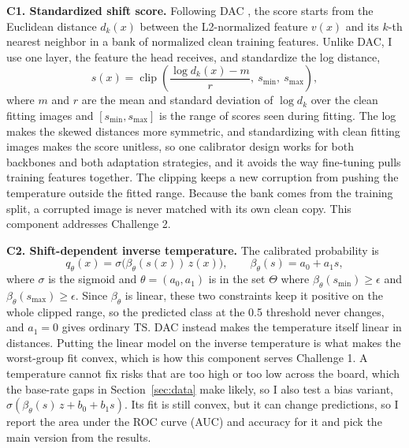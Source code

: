 \documentclass[sigconf,nonacm]{acmart}
\begin{document}
\textbf{C1. Standardized shift score.} Following DAC \cite{tomani2023dac}, the score starts from the Euclidean distance $d_k(x)$ between the L2-normalized feature $v(x)$ and its $k$-th nearest neighbor in a bank of normalized clean training features. Unlike DAC, I use one layer, the feature the head receives, and standardize the log distance,
\begin{equation}
  s(x) = \operatorname{clip}\left(\frac{\log d_k(x) - m}{r},\ s_{\min},\ s_{\max}\right),
  \label{eq:score}
\end{equation}
where $m$ and $r$ are the mean and standard deviation of $\log d_k$ over the clean fitting images and $[s_{\min}, s_{\max}]$ is the range of scores seen during fitting. The log makes the skewed distances more symmetric, and standardizing with clean fitting images makes the score unitless, so one calibrator design works for both backbones and both adaptation strategies, and it avoids the way fine-tuning pulls training features together. The clipping keeps a new corruption from pushing the temperature outside the fitted range. Because the bank comes from the training split, a corrupted image is never matched with its own clean copy. This component addresses Challenge 2.

\textbf{C2. Shift-dependent inverse temperature.} The calibrated probability is
\begin{equation}
  q_\theta(x) = \sigma\big(\beta_\theta(s(x))\, z(x)\big), \qquad \beta_\theta(s) = a_0 + a_1 s,
  \label{eq:calib}
\end{equation}
where $\sigma$ is the sigmoid and $\theta = (a_0, a_1)$ is in the set $\Theta$ where $\beta_\theta(s_{\min}) \geq \epsilon$ and $\beta_\theta(s_{\max}) \geq \epsilon$. Since $\beta_\theta$ is linear, these two constraints keep it positive on the whole clipped range, so the predicted class at the 0.5 threshold never changes, and $a_1 = 0$ gives ordinary TS. DAC instead makes the temperature itself linear in distances. Putting the linear model on the inverse temperature is what makes the worst-group fit convex, which is how this component serves Challenge 1. A temperature cannot fix risks that are too high or too low across the board, which the base-rate gaps in Section~\ref{sec:data} make likely, so I also test a bias variant, $\sigma(\beta_\theta(s)\, z + b_0 + b_1 s)$. Its fit is still convex, but it can change predictions, so I report the area under the ROC curve (AUC) and accuracy for it and pick the main version from the results.
\end{document}
